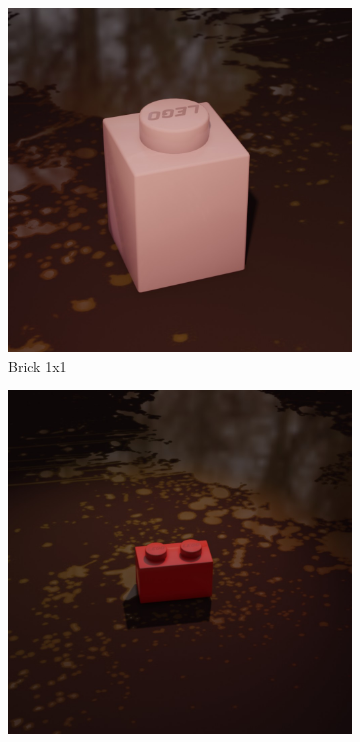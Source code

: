 \documentclass[]{article}
\begin{document}
\begin{figure}[h]
    \centering
    \begin{subfigure}[b]{0.15\textwidth}
        \centering
        \includegraphics[width=\textwidth]{Examples/bricks-1x1.jpg}
        \caption{Brick 1x1}
    \end{subfigure}
    \begin{subfigure}[b]{0.15\textwidth}
        \centering
        \includegraphics[width=\textwidth]{Examples/bricks-1x2.jpg}

\end{subfigure}
\end{figure}
\end{document}
